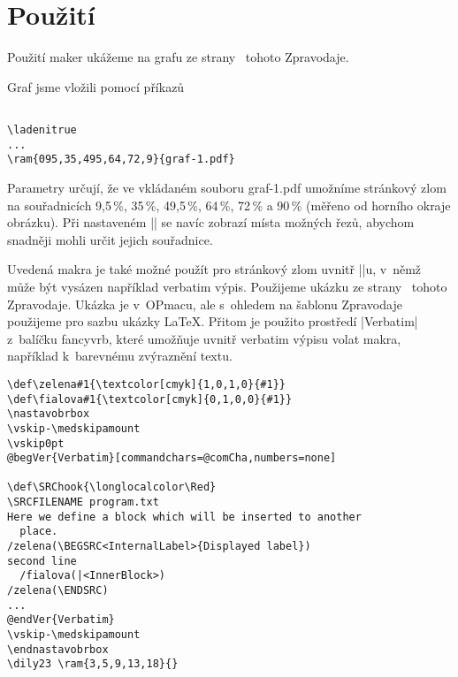 \documentclass{csbulletin}
\def\soub#1{{\sf#1}}
\def\mTODO#1{\marginpar{\hbox{\color{red}\hskip-1cm\bf TODO\hskip3cm\bf TODO}}}
\begin{document}
\JSvvvskip

\section{Použití}

Použití maker ukážeme na grafu ze strany~\mTODO{aktualizovat podle skutečnosti}{\bf??} tohoto Zpravodaje.

\ladenitrue
{}

\noindent
Graf jsme vložili pomocí příkazů
\begin{Verbatim}[numbers=none]

\ladenitrue
...
\ram{095,35,495,64,72,9}{graf-1.pdf}
\end{Verbatim}
\noindent
Parametry určují, že ve vkládaném souboru \soub{graf-1.pdf} umožníme stránkový zlom na souřadnicích 9,5\,\%, 35\,\%, 49,5\,\%, 64\,\%, 72\,\% a 90\,\% (měřeno od horního okraje obrázku). Při nastaveném |\ladenitrue| se navíc zobrazí místa možných řezů, abychom snadněji mohli určit jejich souřadnice.

\def\nastavobrbox{\setbox\obrbox\vbox\bgroup
  \hsize\dimexpr\hsize-2\hodstup\relax}
\def\endnastavobrbox{\egroup}

Uvedená makra je také možné použít pro stránkový zlom uvnitř |\vbox|u, v~němž může být vysázen například verbatim výpis. Použijeme ukázku ze strany~\mTODO{aktualizovat podle skutečnosti}{\bf??} tohoto Zpravodaje. Ukázka je v~OPmacu, ale s~ohledem na šablonu Zpravodaje použijeme pro sazbu ukázky \LaTeX. Přitom je použito prostředí |Verbatim| z~balíčku \soub{fancyvrb}, které umožňuje uvnitř verbatim výpisu volat makra, například k~barevnému zvýraznění textu.

\def\begVer{\char`\\begin}
\def\comCha{/()}
\def\endVer{\char`\\end}
\begin{Verbatim}[commandchars=@QW,numbers=none]
\def\zelena#1{\textcolor[cmyk]{1,0,1,0}{#1}}
\def\fialova#1{\textcolor[cmyk]{0,1,0,0}{#1}}
\nastavobrbox
\vskip-\medskipamount
\vskip0pt
@begVer{Verbatim}[commandchars=@comCha,numbers=none]

\def\SRChook{\longlocalcolor\Red}
\SRCFILENAME program.txt
Here we define a block which will be inserted to another
  place.
/zelena(\BEGSRC<InternalLabel>{Displayed label})
second line
  /fialova(|<InnerBlock>)
/zelena(\ENDSRC)
...
@endVer{Verbatim}
\vskip-\medskipamount
\endnastavobrbox
\dily23 \ram{3,5,9,13,18}{}
\end{Verbatim}
\end{document}
